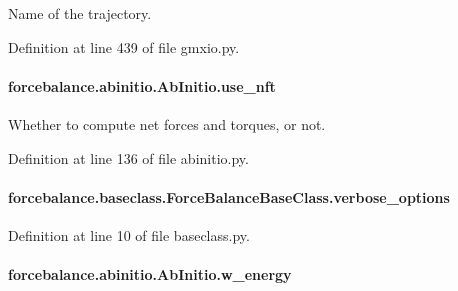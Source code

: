 Name of the trajectory. 



Definition at line 439 of file gmxio.\-py.

\hypertarget{classforcebalance_1_1abinitio_1_1AbInitio_afd8d179560a295ffa6c6309843c59279}{
\paragraph[{use\-\_\-nft}]{\setlength{\rightskip}{0pt plus 5cm}forcebalance.\-abinitio.\-Ab\-Initio.\-use\-\_\-nft\hspace{0.3cm}{\ttfamily [inherited]}}}\label{classforcebalance_1_1abinitio_1_1AbInitio_afd8d179560a295ffa6c6309843c59279}


Whether to compute net forces and torques, or not. 



Definition at line 136 of file abinitio.\-py.

\hypertarget{classforcebalance_1_1baseclass_1_1ForceBalanceBaseClass_a8088e1e20cbd6bc175fb9c9fe9fa0f18}{
\paragraph[{verbose\-\_\-options}]{\setlength{\rightskip}{0pt plus 5cm}forcebalance.\-baseclass.\-Force\-Balance\-Base\-Class.\-verbose\-\_\-options\hspace{0.3cm}{\ttfamily [inherited]}}}\label{classforcebalance_1_1baseclass_1_1ForceBalanceBaseClass_a8088e1e20cbd6bc175fb9c9fe9fa0f18}


Definition at line 10 of file baseclass.\-py.

\hypertarget{classforcebalance_1_1abinitio_1_1AbInitio_aa7f09e2ffc1253844c9f0736caf9b9e5}{
\paragraph[{w\-\_\-energy}]{\setlength{\rightskip}{0pt plus 5cm}forcebalance.\-abinitio.\-Ab\-Initio.\-w\-\_\-energy\hspace{0.3cm}{\ttfamily [inherited]}}}\label{classforcebalance_1_1abinitio_1_1AbInitio_aa7f09e2ffc1253844c9f0736caf9b9e5}


